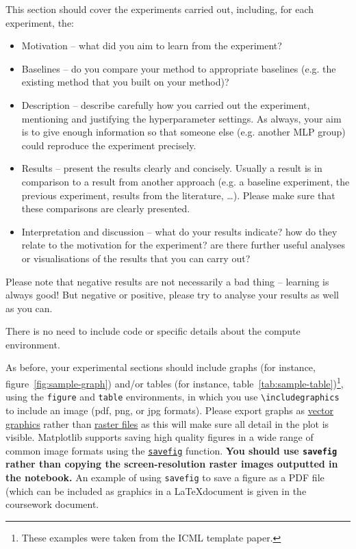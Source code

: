 \documentclass{article}
\begin{document}
\if
This section should cover the experiments carried out, including, for each experiment, the:
\begin{itemize}
    \item  Motivation -- what did you aim to learn from the experiment?
    \item  Baselines -- do you compare your method to appropriate baselines (e.g. the existing method that you built on your method)?
    \item  Description -- describe carefully how you carried out the experiment, mentioning and justifying the hyperparameter settings. As always, your aim is to give enough information so that someone else (e.g. another MLP group) could reproduce the experiment precisely.
    \item  Results -- present the results clearly and concisely. Usually a result is in comparison to a result from another approach (e.g. a baseline experiment, the previous experiment, results from the literature, \dots).  Please make sure that these comparisons are clearly presented.
    \item Interpretation and discussion -- what do your results indicate? how do they relate to the motivation for the experiment? are there further useful analyses or visualisations of the results that you can carry out?
\end{itemize}

Please note that negative results are not necessarily a bad thing -- learning is always good! But negative or positive, please try to analyse your results as well as you can.

There is no need to include code or specific details about the compute environment.

As before, your experimental sections should include graphs (for instance, figure~\ref{fig:sample-graph}) and/or tables (for instance, table~\ref{tab:sample-table})\footnote{These examples were taken from the ICML template paper.}, using the \verb+figure+ and \verb+table+ environments, in which you use \verb+\includegraphics+ to include an image (pdf, png, or jpg formats).  Please export graphs as 
\href{https://en.wikipedia.org/wiki/Vector_graphics}{vector graphics}
rather than \href{https://en.wikipedia.org/wiki/Raster_graphics}{raster
files} as this will make sure all detail in the plot is visible.
Matplotlib supports saving high quality figures in a wide range of
common image formats using the
\href{http://matplotlib.org/api/pyplot_api.html\#matplotlib.pyplot.savefig}{\texttt{savefig}}
function. \textbf{You should use \texttt{savefig} rather than copying
the screen-resolution raster images outputted in the notebook.} An
example of using \texttt{savefig} to save a figure as a PDF file (which
can be included as graphics in a \LaTeX document is given in the coursework document.
\end{document}
